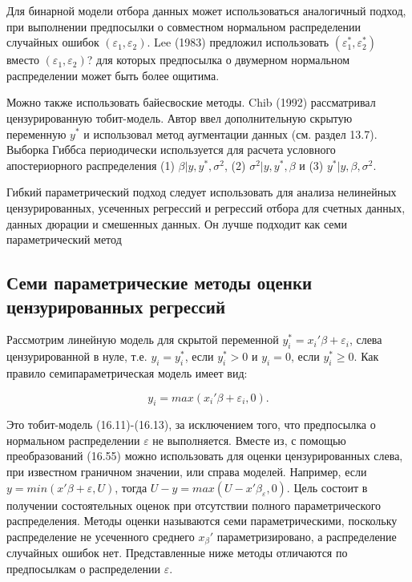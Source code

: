 Для бинарной модели отбора данных может использоваться аналогичный подход, при выполнении предпосылки о совместном нормальном распределении случайных ошибок $(\varepsilon_1,\varepsilon_2)$. Lee (1983) предложил использовать $(\varepsilon_1^{*},\varepsilon_2^{*})$ вместо $(\varepsilon_1,\varepsilon_2)$? для которых предпосылка о двумерном нормальном распределении может быть более ощитима. 

Можно также использовать байесвоские методы. Chib (1992) рассматривал цензурированную тобит-модель. Автор ввел дополнительную скрытую переменную $y^{*}$ и использовал метод аугментации данных (см. раздел 13.7). Выборка Гиббса периодически используется для расчета условного апостериорного распределения (1) $\beta|y,y^{*},\sigma^2$, (2) $\sigma^2|y,y^{*},\beta$ и (3) $y^{*}|y,\beta,\sigma^2$.

Гибкий параметрический подход следует использовать для анализа нелинейных цензурированных, усеченных регрессий и регрессий отбора для счетных данных, данных дюрации и смешенных данных.
Он лучше подходит как семи параметрический метод


\subsection{Семи параметрические методы оценки цензурированных регрессий}


Рассмотрим линейную модель для скрытой переменной $y_i^{*}=x_i'\beta+\varepsilon_i$, слева цензурированной в нуле, т.е. $y_i=y_i^{*}$, если $y_i^{*}>0$ и $y_i=0$, если $y_i^{*}{\geq}0$. Как правило семипараметрическая модель имеет вид:

\begin{equation}
y_i=max(x_i'\beta+\varepsilon_i,0).
\end{equation}

Это тобит-модель (16.11)-(16.13), за исключением того, что предпосылка о нормальном распределении $\varepsilon$ не выполняется. Вместе из, с помощью преобразований (16.55) можно использовать для оценки цензурированных слева, при известном граничном значении, или справа моделей. Например, если $y=min(x'\beta+\varepsilon,U)$, тогда $U-y=max(U-x'\beta_\varepsilon,0)$. Цель состоит в получении состоятельных оценок при отсутствии полного параметрического распределения. Методы оценки называются семи параметрическими, поскольку распределение не усеченного среднего $x_\beta'$ параметризировано, а распределение случайных ошибок нет. Представленные ниже методы отличаются по предпосылкам о распределении $\varepsilon$. 

